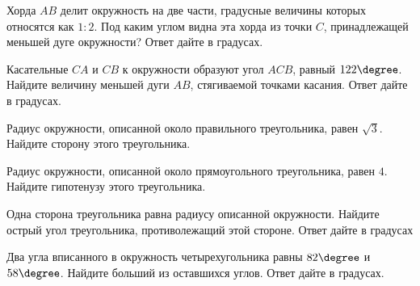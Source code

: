 \begin{homework}[number=3]
	\begin{listofex}
		\item Хорда \( AB \) делит окружность на две части, градусные величины которых относятся как \( 1:2 \). Под каким углом видна эта хорда из точки \( C \), принадлежащей меньшей дуге окружности? Ответ дайте в градусах.
		\item Касательные \( CA \) и \( CB \) к окружности образуют угол \( ACB \), равный \( 122\degree \). Найдите величину меньшей дуги \( AB \), стягиваемой точками касания. Ответ дайте в градусах.
		\item Радиус окружности, описанной около правильного треугольника, равен \( \sqrt{3} \). Найдите сторону этого треугольника.
		\item Радиус окружности, описанной около прямоугольного треугольника, равен \( 4 \). Найдите гипотенузу этого треугольника.
		\item Одна сторона треугольника равна радиусу описанной окружности. Найдите острый угол треугольника, противолежащий этой стороне. Ответ дайте в градусах
		\item Два угла вписанного в окружность четырехугольника равны \( 82\degree\) и \( 58\degree \). Найдите больший из оставшихся углов. Ответ дайте в градусах.
	\end{listofex}
\end{homework}


